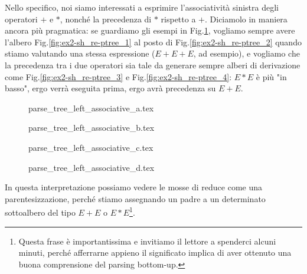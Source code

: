 \documentclass[class=book, crop=false, oneside, 12pt]{standalone}
\begin{document}
Nello specifico, noi siamo interessati a esprimire l'associatività sinistra degli operatori \(+\) e \(*\), nonché la precedenza di \(*\) rispetto a \(+\). Diciamolo in maniera ancora più pragmatica: se guardiamo gli esempi in Fig.\ref{fig:ex2-sh_re-ptree}, vogliamo sempre avere l'albero Fig.\ref{fig:ex2-sh_re-ptree_1} al posto di Fig.\ref{fig:ex2-sh_re-ptree_2} quando stiamo valutando una stessa espressione (\(E + E + E\), ad esempio), e vogliamo che la precedenza tra i due operatori sia tale da generare sempre alberi di derivazione come Fig.\ref{fig:ex2-sh_re-ptree_3} e Fig.\ref{fig:ex2-sh_re-ptree_4}: \(E*E\) è più "in basso", ergo verrà eseguita prima, ergo avrà precedenza su \(E+E\).
\begin{figure}[H]
    \begin{minipage}[b]{.4\textwidth}
        \centering
        {parse_tree_left_associative_a.tex}
        \label{fig:ex2-sh_re-ptree_1}
    \end{minipage}
    \hfill
    \begin{minipage}[b]{.4\textwidth}
        \centering
        {parse_tree_left_associative_b.tex}
        \label{fig:ex2-sh_re-ptree_2}
    \end{minipage}
    
    \begin{minipage}[b]{.4\textwidth}
        \centering
        {parse_tree_left_associative_c.tex}
        \label{fig:ex2-sh_re-ptree_3}
    \end{minipage}
    \hfill
    \begin{minipage}[b]{.4\textwidth}
        \centering
        {parse_tree_left_associative_d.tex}
        \label{fig:ex2-sh_re-ptree_4}
    \end{minipage}
    \caption{}
    \label{fig:ex2-sh_re-ptree}
\end{figure}
In questa interpretazione possiamo vedere le mosse di reduce come una parentesizzazione, perché stiamo assegnando un padre a un determinato sottoalbero del tipo \(E + E\) o \(E * E\)\footnote{Questa frase è importantissima e invitiamo il lettore a spenderci alcuni minuti, perché afferrarne appieno il significato implica di aver ottenuto una buona comprensione del parsing bottom-up.}.
\end{document}
